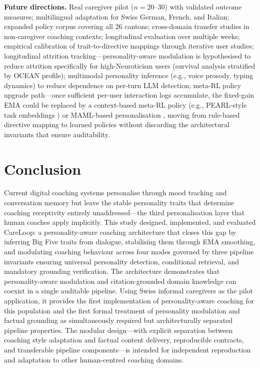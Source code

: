 \documentclass[10pt,a4paper]{report}
\begin{document}
\textbf{Future directions.} Real caregiver pilot ($n = 20$--30) with validated outcome measures; multilingual adaptation for Swiss German, French, and Italian; expanded policy corpus covering all 26 cantons; cross-domain transfer studies in non-caregiver coaching contexts; longitudinal evaluation over multiple weeks; empirical calibration of trait-to-directive mappings through iterative user studies; longitudinal attrition tracking---personality-aware modulation is hypothesised to reduce attrition specifically for high-Neuroticism users (survival analysis stratified by OCEAN profile); multimodal personality inference (e.g., voice prosody, typing dynamics) to reduce dependence on per-turn LLM detection; meta-RL policy upgrade path---once sufficient per-user interaction logs accumulate, the fixed-gain EMA could be replaced by a context-based meta-RL policy (e.g., PEARL-style task embeddings \citep{Rakelly2019}) or MAML-based personalisation \citep{Lin2019}, moving from rule-based directive mapping to learned policies without discarding the architectural invariants that ensure auditability.

\chapter{Conclusion}
\label{ch:conclusion}

Current digital coaching systems personalise through mood tracking and conversation memory but leave the stable personality traits that determine coaching receptivity entirely unaddressed---the third personalisation layer that human coaches apply implicitly. This study designed, implemented, and evaluated CareLoop: a personality-aware coaching architecture that closes this gap by inferring Big Five traits from dialogue, stabilising them through EMA smoothing, and modulating coaching behaviour across four modes governed by three pipeline invariants ensuring universal personality detection, conditional retrieval, and mandatory grounding verification. The architecture demonstrates that personality-aware modulation and citation-grounded domain knowledge can coexist in a single auditable pipeline. Using Swiss informal caregivers as the pilot application, it provides the first implementation of personality-aware coaching for this population and the first formal treatment of personality modulation and factual grounding as simultaneously required but architecturally separated pipeline properties. The modular design---with explicit separation between coaching style adaptation and factual content delivery, reproducible contracts, and transferable pipeline components---is intended for independent reproduction and adaptation to other human-centred coaching domains.
\end{document}
